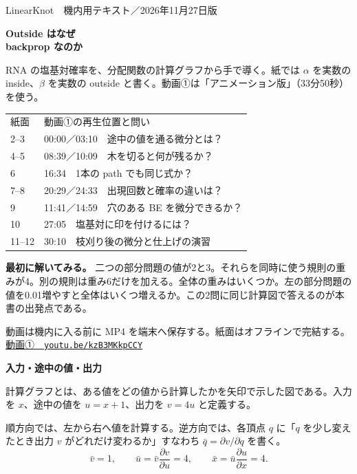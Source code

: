\documentclass[a5paper,10pt]{ltjsarticle}
\newcommand{\unit}[2]{\clearpage{\small 動画①　#1}\par{\Large\bfseries #2}\par\medskip}
\begin{document}
{\small LinearKnot　機内用テキスト／2026年11月27日版}\par\bigskip
{\LARGE\bfseries Outside はなぜ\\backprop なのか}\par\medskip
RNA の塩基対確率を、分配関数の計算グラフから手で導く。紙では $\alpha$ を実数の inside、$\beta$ を実数の outside と書く。動画①は「アニメーション版」（33分50秒）を使う。
\par\medskip
\begin{tabular}{@{}ll@{}}
紙面 & 動画①の再生位置と問い\\
2--3 & 00:00／03:10　途中の値を通る微分とは？\\
4--5 & 08:39／10:09　木を切ると何が残るか？\\
6 & 16:34　1本の path でも同じ式か？\\
7--8 & 20:29／24:33　出現回数と確率の違いは？\\
9 & 11:41／14:59　穴のある BE を微分できるか？\\
10 & 27:05　塩基対に印を付けるには？\\
11--12 & 30:10　枝刈り後の微分と仕上げの演習
\end{tabular}
\par\bigskip
\textbf{最初に解いてみる。} 二つの部分問題の値が2と3。それらを同時に使う規則の重みが4。別の規則は重み6だけを加える。全体の重みはいくつか。左の部分問題の値を0.01増やすと全体はいくつ増えるか。この2問に同じ計算図で答えるのが本書の出発点である。
\par\medskip
動画は機内に入る前に MP4 を端末へ保存する。紙面はオフラインで完結する。\href{https://youtu.be/kzB3MKkpCCY}{動画①　\texttt{youtu.be/kzB3MKkpCCY}}
\unit{00:00／03:10}{入力・途中の値・出力}
計算グラフとは、ある値をどの値から計算したかを矢印で示した図である。入力を $x$、途中の値を $u=x+1$、出力を $v=4u$ と定義する。
\begin{center}\end{center}
順方向では、左から右へ値を計算する。逆方向では、各頂点 $q$ に「$q$ を少し変えたとき出力 $v$ がどれだけ変わるか」すなわち $\bar q=\partial v/\partial q$ を書く。
\[
\bar v=1,\qquad \bar u=\bar v\frac{\partial v}{\partial u}=4,
\qquad \bar x=\bar u\frac{\partial u}{\partial x}=4.
\]
\end{document}
